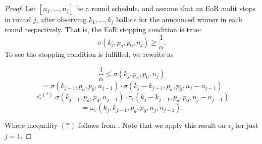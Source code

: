 \begin{proof}
Let $[n_1, \ldots, n_j]$ be a round schedule, and assume that an EoR \BRAVO audit stops in round $j$, after observing $k_1, \ldots, k_j$ ballots for the announced winner in each round respectively.
That is, the EoR \BRAVO stopping condition is true:
$$\sigma(k_j,p_a,p_0,n_j) \ge \frac{1}{\alpha}.$$
To see the \Providence stopping condition is fulfilled, we rewrite as 




\[
 \frac{1}{\alpha} \leq \sigma(k_{j}, p_a, p_0, n_{j}) 
\]
\[
 = \sigma(k_{j-1}, p_a, p_0, n_{j-1}) \cdot \sigma(k_j - k_{j-1}, p_a, p_0, n_j - n_{j-1})  
\]
\[
 \leq^{(*)} \sigma(k_{j-1}, p_a, p_0, n_{j-1}) \cdot \tau_1(k_j - k_{j-1}, p_a, p_0, n_j - n_{j-1}) 
\]
\[
 = \omega_r(k_j, k_{j-1}, p_a, p_0, n_j, n_{j-1}).
\]

Where inequality $(*)$ follows from \cite[Theorem 6]{athena}. Note that we apply this result on $\tau_j$ for just $j=1$.


% 
% 
% 




\end{proof}

